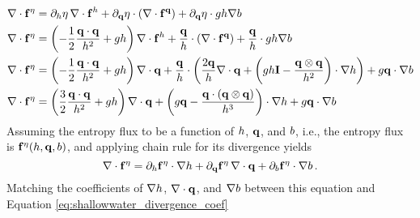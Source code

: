 \begin{align}
  \nabla\cdot\mathbf{f}^\eta
  &= 
    \partial_h\eta\,\nabla\cdot
    \mathbf{f}^h
  + \partial_{\mathbf{q}}\eta\cdot
    \left(\nabla\cdot\mathbf{f}^{\mathbf{q}}\right)
  + \partial_{\mathbf{q}}\eta\cdot gh\nabla b
  \nonumber\\
  \nabla\cdot\mathbf{f}^\eta
  &= 
    \left(-\frac{1}{2}\frac{\mathbf{q}\cdot\mathbf{q}}{h^2}
    + gh\right)
    \nabla\cdot\mathbf{f}^h
    + \frac{\mathbf{q}}{h}\cdot
    \left(\nabla\cdot\mathbf{f}^{\mathbf{q}}\right)
    + \frac{\mathbf{q}}{h}\cdot gh\nabla b
  \nonumber\\
  \nabla\cdot\mathbf{f}^\eta
  &= 
    \left(-\frac{1}{2}\frac{\mathbf{q}\cdot\mathbf{q}}{h^2}
    + gh\right)
    \nabla\cdot\mathbf{q}
    + \frac{\mathbf{q}}{h}\cdot
    \left(\frac{2\mathbf{q}}{h}\nabla\cdot\mathbf{q}
    + \left(gh\mathbf{I}
    - \frac{\mathbf{q}\otimes\mathbf{q}}{h^2}\right)\cdot\nabla h\right)
    + g\mathbf{q}\cdot\nabla b
  \nonumber\\\label{eq:shallowwater_divergence_coef}
  \nabla\cdot\mathbf{f}^\eta
  &= 
    \left(\frac{3}{2}\frac{\mathbf{q}\cdot\mathbf{q}}{h^2}
    + gh\right)
    \nabla\cdot\mathbf{q}
    + \left(g\mathbf{q}
    - \frac{\mathbf{q}\cdot(\mathbf{q}\otimes\mathbf{q})}
    {h^3}\right)\cdot\nabla h
    + g\mathbf{q}\cdot\nabla b
\end{align}
Assuming the entropy flux to be a function of $h$, $\mathbf{q}$,
and $b$, i.e., the entropy flux is
$\mathbf{f}^\eta(h,\mathbf{q},b)$,
and applying chain rule for its divergence yields
\begin{equation}
  \nabla\cdot\mathbf{f}^\eta
  = \partial_h\mathbf{f}^\eta\cdot\nabla h
  + \partial_{\mathbf{q}}\mathbf{f}^\eta
  \,\nabla\cdot\mathbf{q}
  + \partial_b\mathbf{f}^\eta\cdot\nabla b
  \,.
\end{equation}
Matching the coefficients of $\nabla h$, $\nabla\cdot\mathbf{q}$,
and $\nabla b$
between this equation and Equation \eqref{eq:shallowwater_divergence_coef}
